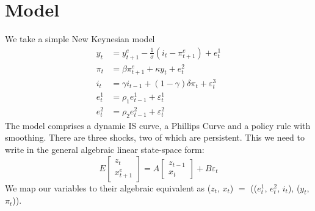 \documentclass[
  letterpaper,
]{book}
\begin{document}
\hypertarget{model}{%
\section{Model}\label{model}}

We take a simple New Keynesian model \[
\begin{align}
y_t    &= y_{t+1}^e-\frac{1}{\sigma} (i_t - \pi_{t+1}^e) + e_t^1 \\
\pi_t  &= \beta \pi_{t+1}^e + \kappa y_t + e_t^2 \\
i_t    &= \gamma i_{t-1} + (1-\gamma) \delta \pi_t + \varepsilon_t^3 \\ 
e_t^1  &= \rho_1 e_{t-1}^1 + \varepsilon_t^1 \\ 
e_t^2  &= \rho_2 e_{t-1}^2 + \varepsilon_t^2 
\end{align}
\] The model comprises a dynamic IS curve, a Phillips Curve and a policy
rule with smoothing. There are three shocks, two of which are
persistent. This we need to write in the general algebraic linear
state-space form: \[
E\begin{bmatrix} z_t \\ x_{t+1}^e \end{bmatrix} = A \begin{bmatrix} z_{t-1} \\ x_t \end{bmatrix} + B \varepsilon_t  
\] We map our variables to their algebraic equivalent as (\(z_t\),
\(x_t\)) \(=\) ((\(e^1_t\), \(e^2_t\), \(i_t\)), (\(y_t\), \(\pi_t\))).
\end{document}
